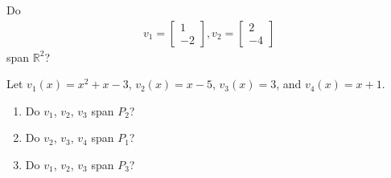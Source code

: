 \documentclass[12pt,a4paper]{article}
\newcounter{example}[section]
\begin{document}
	\begin{example}
	Do
		\begin{align*}
		v_1 = \begin{bmatrix}
		1 \\ -2
		\end{bmatrix} ,
		v_2 = \begin{bmatrix}
		2 \\ -4
		\end{bmatrix}
		\end{align*}
	span $\mathbb{R}^2$?
	\end{example}
	
	\newpage
	
	\begin{example}
	Let $v_1(x) = x^2 + x - 3$, $v_2 (x) = x - 5$, $v_3 (x) = 3$, and $v_4 (x) = x + 1$.
		\begin{enumerate}
		\item Do $v_1$, $v_2$, $v_3$ span $P_2$?
		\item Do $v_2$, $v_3$, $v_4$ span $P_1$?
		\item Do $v_1$, $v_2$, $v_3$ span $P_3$?
		\end{enumerate}
	\end{example}
	
	\newpage
	
	\phantom{2}
\end{document}
